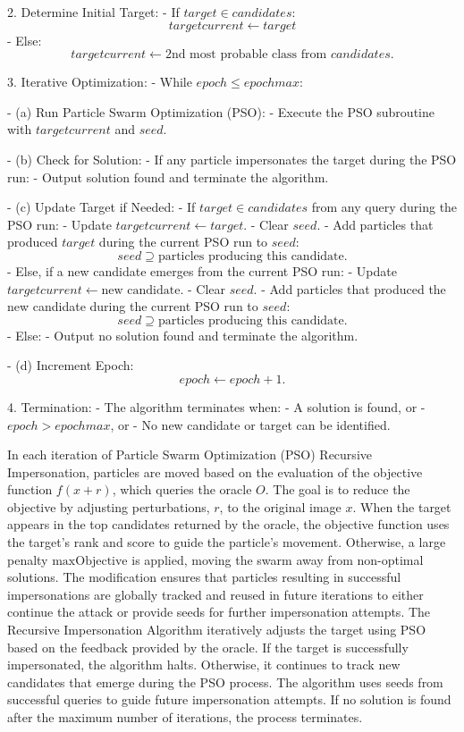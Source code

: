 2. Determine Initial Target:
   - If $target \in candidates$:
     \[
     targetcurrent \gets target
     \]
   - Else:
     \[
     targetcurrent \gets \text{2nd most probable class from } candidates.
     \]

3. Iterative Optimization:
   - While $epoch \leq epochmax$:
     
     - (a) Run Particle Swarm Optimization (PSO):
       - Execute the PSO subroutine with $targetcurrent$ and $seed$.
       
     - (b) Check for Solution:
       - If any particle impersonates the target during the PSO run:
         - Output solution found and terminate the algorithm.
       
     - (c) Update Target if Needed:
       - If $target \in candidates$ from any query during the PSO run:
         - Update $targetcurrent \gets target$.
         - Clear $seed$.
         - Add particles that produced $target$ during the current PSO run to $seed$:
           \[
           seed \supseteq \text{particles producing this candidate}.
           \]
       - Else, if a new candidate emerges from the current PSO run:
         - Update $targetcurrent \gets \text{new candidate}$.
         - Clear $seed$.
         - Add particles that produced the new candidate during the current PSO run to $seed$:
           \[
           seed \supseteq \text{particles producing this candidate}.
           \]
       - Else:
         - Output no solution found and terminate the algorithm.
     
     - (d) Increment Epoch:
       \[
       epoch \gets epoch + 1.
       \]

4. Termination:
   - The algorithm terminates when:
     - A solution is found, or
     - $epoch > epochmax$, or
     - No new candidate or target can be identified.

In each iteration of Particle Swarm Optimization (PSO) Recursive Impersonation, particles are moved based on the evaluation of the objective function $f(x + r)$, which queries the oracle $O$. The goal is to reduce the objective by adjusting perturbations, $r$, to the original image $x$. When the target appears in the top candidates returned by the oracle, the objective function uses the target's rank and score to guide the particle's movement. Otherwise, a large penalty $\text{maxObjective}$ is applied, moving the swarm away from non-optimal solutions.
The modification ensures that particles resulting in successful impersonations are globally tracked and reused in future iterations to either continue the attack or provide seeds for further impersonation attempts.
The Recursive Impersonation Algorithm iteratively adjusts the target using PSO based on the feedback provided by the oracle. If the target is successfully impersonated, the algorithm halts. Otherwise, it continues to track new candidates that emerge during the PSO process. The algorithm uses seeds from successful queries to guide future impersonation attempts. If no solution is found after the maximum number of iterations, the process terminates.
